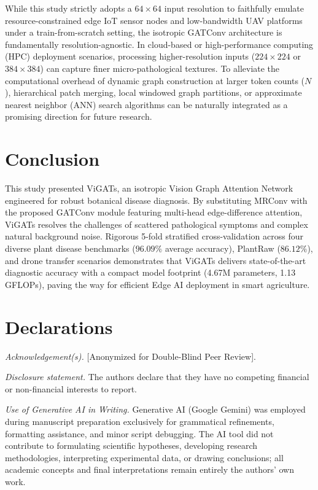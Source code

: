\documentclass[]{interact}
\theoremstyle{plain}
\theoremstyle{definition}
\theoremstyle{remark}
\begin{document}
While this study strictly adopts a $64\times64$ input resolution to faithfully emulate resource-constrained edge IoT sensor nodes and low-bandwidth UAV platforms under a train-from-scratch setting, the isotropic GATConv architecture is fundamentally resolution-agnostic. In cloud-based or high-performance computing (HPC) deployment scenarios, processing higher-resolution inputs ($224\times224$ or $384\times384$) can capture finer micro-pathological textures. To alleviate the computational overhead of dynamic graph construction at larger token counts ($N$), hierarchical patch merging, local windowed graph partitions, or approximate nearest neighbor (ANN) search algorithms can be naturally integrated as a promising direction for future research.


\section{Conclusion}
\label{sec:conclusion}

This study presented ViGATs, an isotropic Vision Graph Attention Network engineered for robust botanical disease diagnosis. By substituting MRConv with the proposed GATConv module featuring multi-head edge-difference attention, ViGATs resolves the challenges of scattered pathological symptoms and complex natural background noise. Rigorous 5-fold stratified cross-validation across four diverse plant disease benchmarks ($96.09\%$ average accuracy), PlantRaw ($86.12\%$), and drone transfer scenarios demonstrates that ViGATs delivers state-of-the-art diagnostic accuracy with a compact model footprint (4.67M parameters, 1.13 GFLOPs), paving the way for efficient Edge AI deployment in smart agriculture.


\section*{Declarations}

\textit{Acknowledgement(s).} [Anonymized for Double-Blind Peer Review].

\textit{Disclosure statement.} The authors declare that they have no competing financial or non-financial interests to report.

\textit{Use of Generative AI in Writing.} Generative AI (Google Gemini) was employed during manuscript preparation exclusively for grammatical refinements, formatting assistance, and minor script debugging. The AI tool did not contribute to formulating scientific hypotheses, developing research methodologies, interpreting experimental data, or drawing conclusions; all academic concepts and final interpretations remain entirely the authors' own work.
\end{document}
